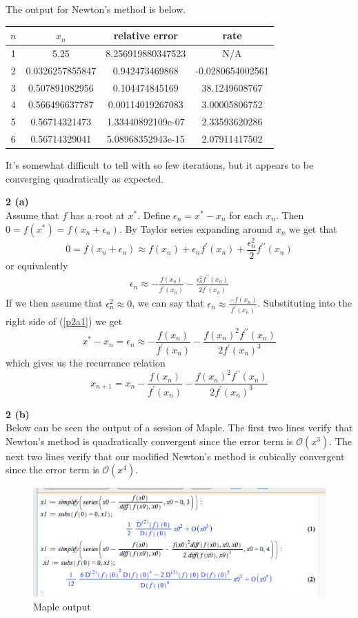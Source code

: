 \documentclass[12pt]{article}
\newcommand{\problem}[1]{\hspace{-4 ex} \large \textbf{#1}\\}
\begin{document}
	The output for Newton's method is below.
	\begin{center}
	    \begin{tabular}{|c|c|c|c|}
	    	\hline
	    	$n$&$x_n$&relative error&rate\\ \hline
	    	1&5.25&8.256919880347523&N/A\\ \hline
	    	2&0.0326257855847&0.942473469868&-0.0280654002561\\ \hline
	    	3&0.507891082956&0.104474845169&38.1249608767\\ \hline
	    	4&0.566496637787&0.00114019267083&3.00005806752\\ \hline
	    	5&0.56714321473&1.33440892109e-07&2.33593620286\\ \hline
	    	6&0.56714329041&5.08968352943e-15&2.07911417502\\ \hline
	    \end{tabular}
	\end{center}
    It's somewhat difficult to tell with so few iterations, but it appears to be converging quadratically as expected.
    
\problem{2 (a)}
	Assume that $f$ has a root at $x^*$. Define $\epsilon_n = x^*-x_n$ for each $x_n$. Then $0 = f(x^*) = f(x_n + \epsilon_n)$. By Taylor series expanding around $x_n$ we get that 
	$$
	0 = f(x_n + \epsilon_n) \approx f(x_n) + \epsilon_n f^\prime(x_n) + \frac{\epsilon_n^2}{2}f^{\prime\prime}(x_n)
	$$
	or equivalently
	\begin{align}\label{p2a1}
	\epsilon_n \approx -\frac{f(x_n)}{f^\prime(x_n)} - \frac{\epsilon_n^2f^{\prime\prime}(x_n)}{2f^\prime(x_n)}
	\end{align}
	If we then assume that $\epsilon_n^2 \approx 0$, we can say that $\epsilon_n \approx \frac{-f(x_n)}{f^\prime(x_n)}$. Substituting into the right side of (\ref{p2a1}) we get 
	$$
	x^* - x_n = \epsilon_n \approx -\frac{f(x_n)}{f^\prime(x_n)} - \frac{f(x_n)^2f^{\prime\prime}(x_n)}{2f^\prime(x_n)^3}
	$$
	which gives us the recurrance relation
	$$
	x_{n+1} = x_n -\frac{f(x_n)}{f^\prime(x_n)} - \frac{f(x_n)^2f^{\prime\prime}(x_n)}{2f^\prime(x_n)^3}
	$$
	
\problem{2 (b)}
	Below can be seen the output of a session of Maple. The first two lines verify that Newton's method is quadratically convergent since the error term is $\mathcal{O}(x^3)$. The next two lines verify that our modified Newton's method is cubically convergent since the error term is $\mathcal{O}(x^4)$.
	
	\begin{figure}[h]
		\caption{Maple output}
		\centering
		\includegraphics[width=.75\textwidth]{hw2_p3b}
	\end{figure}
	
\end{document}
